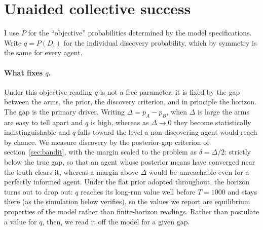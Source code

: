\documentclass[12pt]{article}
\begin{document}
\section{Unaided collective success}
\label{sec:unaided}

I use $P$ for the ``objective'' probabilities determined by the model specifications. Write $q = P(D_i)$ for the individual discovery probability, which by symmetry is the same for every agent.

\paragraph{What fixes $q$.}
Under this objective reading $q$ is not a free parameter; it is fixed by the gap between the arms, the prior, the discovery criterion, and in principle the horizon. The gap is the primary driver. Writing $\Delta = p_A - p_B$, when $\Delta$ is large the arms are easy to tell apart and $q$ is high, whereas as $\Delta \to 0$ they become statistically indistinguishable and $q$ falls toward the level a non-discovering agent would reach by chance. We measure discovery by the posterior-gap criterion of section~\ref{sec:bandit}, with the margin scaled to the problem as $\delta = \Delta/2$: strictly below the true gap, so that an agent whose posterior means have converged near the truth clears it, whereas a margin above $\Delta$ would be unreachable even for a perfectly informed agent. Under the flat prior adopted throughout, the horizon turns out to drop out: $q$ reaches its long-run value well before $T = 1000$ and stays there (as the simulation below verifies), so the values we report are equilibrium properties of the model rather than finite-horizon readings. Rather than postulate a value for $q$, then, we read it off the model for a given gap.
\end{document}
